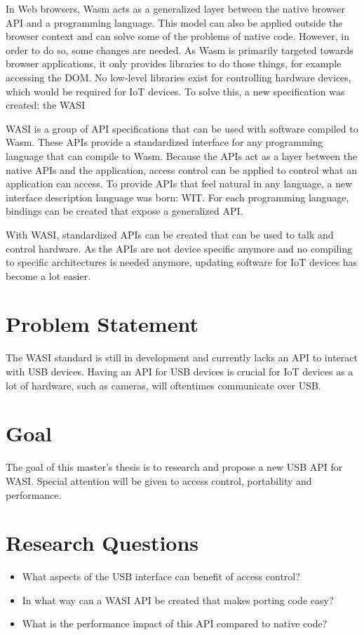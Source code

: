 In Web browsers, \acrfull{Wasm} acts as a generalized layer between the native browser API and a programming language. This model can also be applied outside the browser context and can solve some of the problems of native code. However, in order to do so, some changes are needed. As \acrshort{Wasm} is primarily targeted towards browser applications, it only provides libraries to do those things, for example accessing the DOM. No low-level libraries exist for controlling hardware devices, which would be required for \acrshort{IoT} devices. To solve this, a new specification was created: the \acrfull{WASI}

\acrshort{WASI} is a group of API specifications that can be used with software compiled to \acrshort{Wasm}. These APIs provide a standardized interface for any programming language that can compile to \acrshort{Wasm}. Because the APIs act as a layer between the native APIs and the application, access control can be applied to control what an application can access. To provide APIs that feel natural in any language, a new interface description language was born: \acrfull{WIT}. For each programming language, bindings can be created that expose a generalized API.

With \acrshort{WASI}, standardized APIs can be created that can be used to talk and control hardware. As the APIs are not device specific anymore and no compiling to specific architectures is needed anymore, updating software for \acrshort{IoT} devices has become a lot easier.

\section*{Problem Statement}

The \acrshort{WASI} standard is still in development and currently lacks an API to interact with USB devices. Having an API for USB devices is crucial for \acrshort{IoT} devices as a lot of hardware, such as cameras, will oftentimes communicate over USB.

\section*{Goal}

The goal of this master's thesis is to research and propose a new USB API for \acrshort{WASI}. Special attention will be given to access control, portability and performance.

\section*{Research Questions}

\begin{itemize}

\item What aspects of the USB interface can benefit of access control?

\item In what way can a WASI API be created that makes porting code easy?

\item What is the performance impact of this API compared to native code?

\end{itemize}
